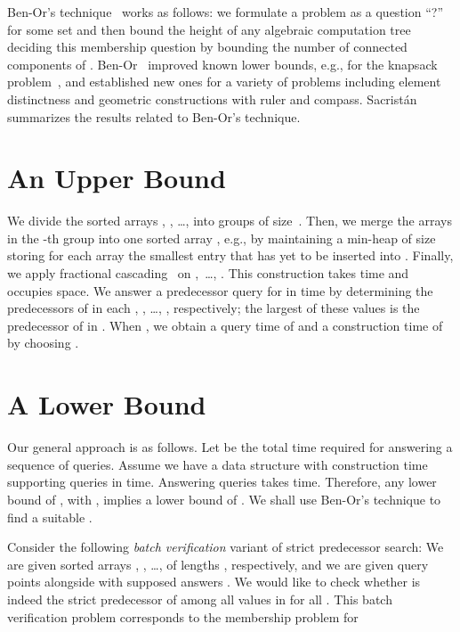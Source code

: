 \documentclass[orivec]{llncs}
\begin{document}
Ben-Or's technique~\cite{benor1983lower} works as follows: we formulate a problem as a question \enquote{?} for some set  and then bound the height of any algebraic computation tree deciding this membership question by bounding the number of connected components of . Ben-Or~\cite{benor1983lower} improved known lower bounds, e.g., for the knapsack problem~\cite{dobkin1978lower}, and established new ones for a variety of problems including element distinctness and geometric constructions with ruler and compass. Sacristán~\cite{sacristan1999lower} summarizes the results related to Ben-Or's technique. 

\section{An Upper Bound} \label{sec::upperbound}


We divide the sorted arrays , , \dots,  into groups of size~. Then, we merge the  arrays in the -th group into one sorted array , e.g., by maintaining a min-heap of size  storing for each array the smallest entry that has yet to be inserted into . Finally, we apply fractional cascading~\cite{chazelle1986fractional} on ,~\dots, . This construction takes  time and occupies  space. We answer a predecessor query for  in  time by determining the predecessors  of  in each , , \dots, , respectively; the largest of these values is the predecessor of  in . When , we obtain a query time of  and a  construction time of  by choosing .  

\section{A Lower Bound} \label{sec::lowerbound}

Our general approach is as follows. Let  be the total time required for answering a sequence of  queries. Assume we have a data structure with construction time  supporting queries in  time. Answering  queries takes  time. Therefore, any lower bound of , with , implies a lower bound of . We shall use Ben-Or's technique to find a suitable . 

Consider the following \emph{batch verification} variant of strict predecessor search: We are given  sorted arrays , , \dots,  of lengths , respectively, and we are given  query points  alongside with  supposed answers . We would like to check whether  is indeed the strict predecessor of  among all values in  for all . This batch verification problem corresponds to the membership problem for 
\end{document}
